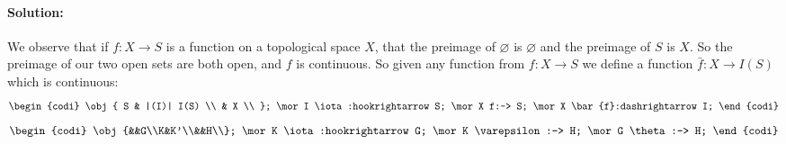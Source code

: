 \documentclass{article}
\begin{document}
\begin{enumerate}
        \paragraph{Solution: }We observe that if $f:X\to S$ is a function on a topological space $X$, that the preimage of $\varnothing$ is $\varnothing$ and the preimage of $S$ is $X$. So the preimage of our two open sets are both open, and $f$ is continuous. So given any function from $f:X\to S$ we define a function $\bar{f}:X\to I(S)$ which is continuous:
        \[ \begin{codi}
            \obj{ S & |(I)| I(S) \\ & X \\ };
            \mor I \iota:hookrightarrow S;
            \mor X f:-> S; 
            \mor X \bar{f}:dashrightarrow I;
        \end{codi} \] 
        \[ \begin{codi}
            \obj{&&G\\K&K'\\&&H\\};
            \mor K \iota:hookrightarrow G;
            \mor K \varepsilon:-> H; 
            \mor G \theta:-> H; 
        \end{codi} \] 

\end{enumerate}
\end{document}
